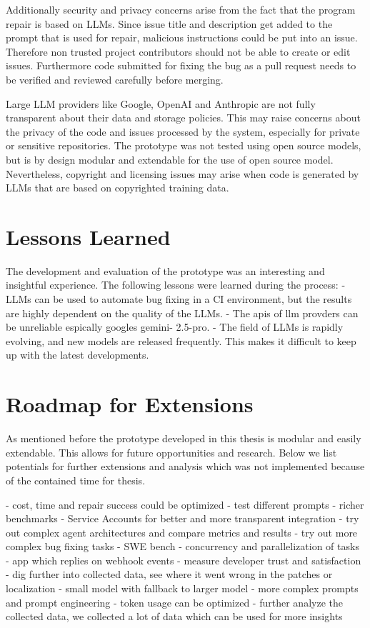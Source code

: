 Additionally security and privacy concerns arise from the fact that the program repair is based on LLMs. Since issue title and description get added to the prompt that is used for repair, malicious instructions could be put into an issue. Therefore non trusted project contributors should not be able to create or edit issues. Furthermore code submitted for fixing the bug as a pull request needs to be verified and reviewed carefully before merging.

Large LLM providers like Google, OpenAI and Anthropic are not fully transparent about their data and storage policies. This may raise concerns about the privacy of the code and issues processed by the system, especially for private or sensitive repositories. The prototype was not tested using open source models, but is by design modular and  extendable for the use of open source model. Nevertheless, copyright and licensing issues may arise when code is generated by LLMs that are based on copyrighted training data. \cite{sauvolaFutureSoftwareDevelopment2024, houLargeLanguageModels2024}


\section{Lessons Learned}
The development and evaluation of the prototype was an interesting and insightful experience. The following lessons were learned during the process:
- LLMs can be used to automate bug fixing in a CI environment, but the results are highly dependent on the quality of the LLMs.
- The apis of llm provders can be unreliable espically googles gemini- 2.5-pro.
- The field of LLMs is rapidly evolving, and new models are released frequently. This makes it difficult to keep up with the latest developments.


\section{Roadmap for Extensions} \label{section:roadmap}
As mentioned before the prototype developed in this thesis is modular and easily extendable. This allows for future opportunities and research. Below we list potentials for further extensions and analysis which was not implemented because of the contained time for thesis.

- cost, time and repair success could be optimized
- test different prompts
- richer benchmarks
- Service Accounts for better and more transparent integration
- try out complex agent architectures and compare metrics and results
- try out more complex bug fixing tasks - SWE bench
- concurrency and parallelization of tasks
- app which replies on webhook events
- measure developer trust and satisfaction
- dig further into collected data, see where it went wrong in the patches or localization
- small model with fallback to larger model
- more complex prompts and prompt engineering
- token usage can be optimized
- further analyze the collected data, we collected a lot of data which can be used for more insights